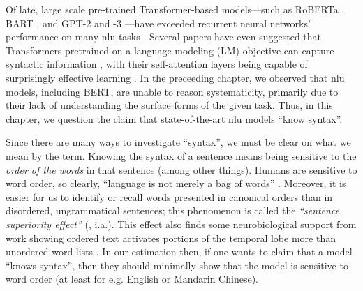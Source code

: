 \documentclass[letterpaper, 12pt]{report}
\begin{document}
Of late, large scale pre-trained Transformer-based \citep{vaswani-etal-2017-attention} models---such as RoBERTa \citep{liu-et-al-2019-roberta}, BART \citep{lewis-etal-2020-bart}, and GPT-2 and -3 \citep{radford-etal-2019-language,Brown2020:GPT3}---have exceeded recurrent neural networks' performance on many \acrshort{nlu} tasks \citep{wang-etal-2018-glue, wang-etal-2019-superglue}. %
Several papers have even suggested that Transformers pretrained on a language modeling (LM) objective can capture syntactic information \citep{hewitt-manning-2019-structural,jawahar-etal-2019-bert, warstadt-bowman-2020-can, wu-etal-2020-perturbed}, with their self-attention layers being capable of surprisingly effective learning \cite{rogers-etal-2020-primer}.
In the preceeding chapter, we observed that \acrshort{nlu} models, including BERT, are unable to reason systematicity, primarily due to their lack of understanding the surface forms of the given task. Thus, in this chapter, we question the claim that state-of-the-art \acrshort{nlu} models ``know syntax''.

Since there are many ways to investigate ``syntax'', we must be clear on what we mean by the term.
Knowing the syntax of a sentence means being sensitive to the \textit{order of the words} in that sentence (among other things).  Humans are sensitive to word order, so clearly, ``language is not merely a bag of words'' \citep[p.156]{harris1954distributional}.
Moreover, it is easier for us to identify or recall words presented in canonical orders than in disordered, ungrammatical sentences; this phenomenon is called the \textit{``sentence superiority effect''} (\citealt{cattell-1886-time, scheerer1981early, toyota-2001-changes, baddeley-etal-2009-working, snell-grainger-2017-sentence, snell2019word, wen-etal-2019-parallel}, i.a.).
This effect also finds some neurobiological support from work showing ordered text activates portions of the temporal lobe more than unordered word lists \citep{bemis-pylkkanen-2013-basic, pylkkanen-etal-2014-building}.
In our estimation then, if one wants to claim that  a model ``knows syntax'', then they should minimally show that the model is sensitive to word order (at least for e.g. English or Mandarin Chinese).
\end{document}
